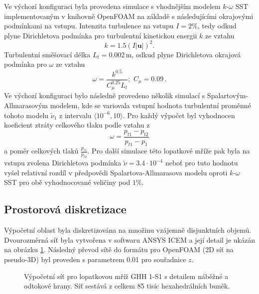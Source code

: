 Ve výchozí konfiguraci byla provedena simulace s vhodnějším modelem $k\text{-}\omega$ SST implementovaným v knihovně OpenFOAM na základě \cite{menter1994two, menter2003ten, rumsey2013menter} s následujícími okrajovými podmínkami na vstupu. Intenzita turbulence na vstupu $ I=2\% $, tedy odkud plyne Dirichletova podmínka pro turbulentní kinetickou energii $ k $ ze vztahu  \begin{equation}\label{key}
k=1.5(I|\mathbf{u}|)^2.
\end{equation} 
Turbulentní směšovací délka $ L_t=0.002\,\mathrm{m} $, odkud plyne Dirichletova okrajová podmínka pro $ \omega $ ze vztahu
\begin{equation}\label{key}
\omega=\dfrac{k^{0.5}}{C_\mu^{0.25}L_t};\,\, C_\mu=0.09\,.
\end{equation} 
Ve výchozí konfiguraci bylo následně provedeno několik simulací s Spalartovým-Allmarasovým modelem, kde se variovala vstupní hodnota turbulentní proměnné tohoto modelu $ \tilde{\nu}_1 $ z intervalu $ \langle 10^{-6},10 \rangle $. Pro každý výpočet byl vyhodnocen koeficient ztráty celkového tlaku podle vztahu z \cite{steinert1990design}
\begin{equation}\label{key}
\omega = \dfrac{p_{t1}-p_{t2}}{p_{t1}-p_1}
\end{equation}
a poměr celkových tlaků $ \frac{p_{t1}}{p_{t2}} $. Pro další simulace této lopatkové mříže pak byla na vstupu zvolena Dirichletova podmínka $ \tilde{\nu} = 3.4\cdot 10^{-4} $ neboť pro tuto hodnotu vyšel relativní rozdíl v předpovědi Spalartova-Allmarasova modelu oproti $k\text{-}\omega$ SST pro obě vyhodnocované veličiny pod $ 1\% $.

\subsection{Prostorová diskretizace}

Výpočetní oblast byla diskretizována na množinu vzájemně disjunktních objemů. Dvourozměrná síť byla vytvořena v softwaru ANSYS ICEM a její detail je ukázán na obrázku \ref{fig:ghs1_sit}. Následný převod sítě do formátu pro OpenFOAM (2D síť na pseudo-3D) byl proveden s parametrem 0.01 pro souřadnice $ z $.

\begin{figure}
	\centering
	\def\svgwidth{1\textwidth}
	\graphicspath{{img/inkscape/}}
	
	\caption[Výpočetní síť mříže GHH 1-S1]{Výpočetní síť pro lopatkovou mříž GHH 1-S1 s detailem náběžné a odtokové hrany. Síť sestává z celkem 85 tisíc hexahedrálních buněk. }
	\label{fig:ghs1_sit}
\end{figure}

